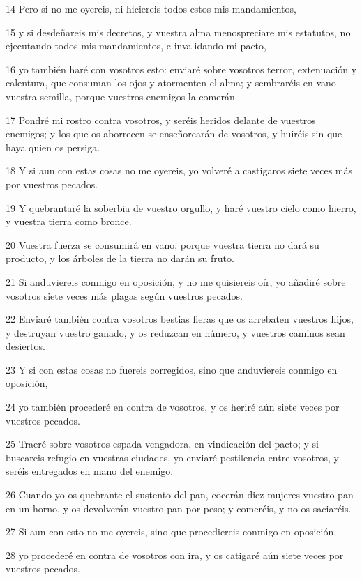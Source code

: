 \par 14 Pero si no me oyereis, ni hiciereis todos estos mis mandamientos,
\par 15 y si desdeñareis mis decretos, y vuestra alma menospreciare mis estatutos, no ejecutando todos mis mandamientos, e invalidando mi pacto,
\par 16 yo también haré con vosotros esto: enviaré sobre vosotros terror, extenuación y calentura, que consuman los ojos y atormenten el alma; y sembraréis en vano vuestra semilla, porque vuestros enemigos la comerán.
\par 17 Pondré mi rostro contra vosotros, y seréis heridos delante de vuestros enemigos; y los que os aborrecen se enseñorearán de vosotros, y huiréis sin que haya quien os persiga.
\par 18 Y si aun con estas cosas no me oyereis, yo volveré a castigaros siete veces más por vuestros pecados.
\par 19 Y quebrantaré la soberbia de vuestro orgullo, y haré vuestro cielo como hierro, y vuestra tierra como bronce.
\par 20 Vuestra fuerza se consumirá en vano, porque vuestra tierra no dará su producto, y los árboles de la tierra no darán su fruto.
\par 21 Si anduviereis conmigo en oposición, y no me quisiereis oír, yo añadiré sobre vosotros siete veces más plagas según vuestros pecados.
\par 22 Enviaré también contra vosotros bestias fieras que os arrebaten vuestros hijos, y destruyan vuestro ganado, y os reduzcan en número, y vuestros caminos sean desiertos.
\par 23 Y si con estas cosas no fuereis corregidos, sino que anduviereis conmigo en oposición,
\par 24 yo también procederé en contra de vosotros, y os heriré aún siete veces por vuestros pecados.
\par 25 Traeré sobre vosotros espada vengadora, en vindicación del pacto; y si buscareis refugio en vuestras ciudades, yo enviaré pestilencia entre vosotros, y seréis entregados en mano del enemigo.
\par 26 Cuando yo os quebrante el sustento del pan, cocerán diez mujeres vuestro pan en un horno, y os devolverán vuestro pan por peso; y comeréis, y no os saciaréis.
\par 27 Si aun con esto no me oyereis, sino que procediereis conmigo en oposición,
\par 28 yo procederé en contra de vosotros con ira, y os catigaré aún siete veces por vuestros pecados.
